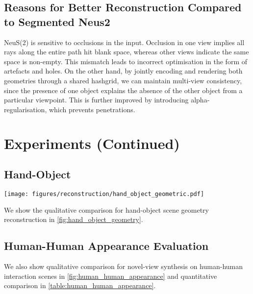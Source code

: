 \subsection{Reasons for Better Reconstruction Compared to Segmented Neus2}
\label{sec:on_segmented_neus2}
NeuS(2) is sensitive to occlusions in the input. Occlusion in one view implies all rays along the entire path hit blank space, whereas other views indicate the same space is non-empty. This mismatch leads to incorrect optimisation in the form of artefacts and holes. On the other hand, by jointly encoding and rendering both geometries through a shared hashgrid, we can maintain multi-view consistency, since the presence of one object explains the absence of the other object from a particular viewpoint. This is further improved by introducing alpha-regularisation, which prevents penetrations.
\section{Experiments (Continued)}
\subsection{Hand-Object}
\begin{figure*}
    \centering
    \texttt{[image: figures/reconstruction/hand\_object\_geometric.pdf]}
    \caption{Qualitative comparison on the  AffordPose dataset. The regions highlighted in red indicate apparent differences in the reconstructions. In the case of Segmented Neus2, for the pot scene, reconstruction of the hand fails (hence not shown). \textbf{Best viewed when zoomed.}
    } 
    \label{fig:hand_object_geometry}
    \vspace{-1em}
\end{figure*}
We show the qualitative comparison for hand-object scene geometry reconstruction in \cref{fig:hand_object_geometry}.
\subsection{Human-Human Appearance Evaluation}
\label{sec:human_human_appearance_suppl}
We also show qualitative comparison for novel-view synthesis on human-human interaction scenes in \cref{fig:human_human_appearance} and quantitative comparison in \cref{table:human_human_appearance}.

